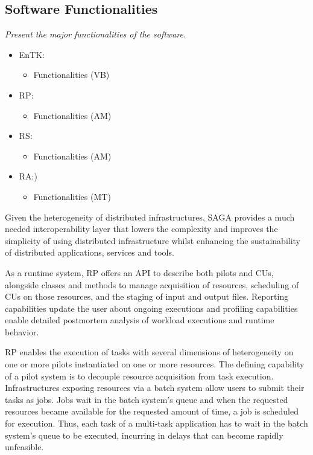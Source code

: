 \documentclass[preprint,12pt, a4paper]{elsarticle}
\begin{document}
\subsection{Software Functionalities}\label{ssec:functionalities}

{\em Present the major functionalities of the software.}

\begin{itemize}
  \item EnTK\@:
  \begin{itemize}
    \item Functionalities (VB)
  \end{itemize}
  \item RP\@: 
  \begin{itemize}
    \item Functionalities (AM)
  \end{itemize}
  \item RS\@:
  \begin{itemize}
    \item Functionalities (AM)
  \end{itemize}
  \item RA\@:)
  \begin{itemize}
    \item Functionalities (MT)
  \end{itemize}
\end{itemize}

Given the heterogeneity of distributed infrastructures, SAGA provides a much
needed interoperability layer that lowers the complexity and improves the
simplicity of using distributed infrastructure whilst enhancing the
sustainability of distributed applications, services and
tools.

As a runtime system, RP offers an API to describe both pilots and CUs,
alongside classes and methods to manage acquisition of resources, scheduling
of CUs on those resources, and the staging of input and output files.
Reporting capabilities update the user about ongoing executions and profiling
capabilities enable detailed postmortem analysis of workload executions and
runtime behavior.

RP enables the execution of tasks with several dimensions of heterogeneity on
one or more pilots instantiated on one or more resources. The defining
capability of a pilot system is to decouple resource acquisition from task
execution. Infrastructures exposing resources via a batch system allow users
to submit their tasks as jobs. Jobs wait in the batch system's queue and when
the requested resources became available for the requested amount of time, a
job is scheduled for execution. Thus, each task of a multi-task application
has to wait in the batch system's queue to be executed, incurring in delays
that can become rapidly unfeasible.
\end{document}
